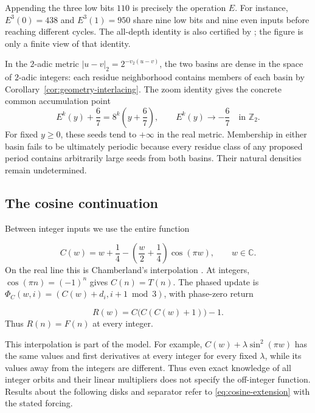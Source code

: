 Appending the three low bits $110$ is precisely the operation $E$.
For instance, $E^3(0)=438$ and $E^3(1)=950$ share nine low bits and
nine even inputs before reaching different cycles.
The all-depth identity is also certified by
; the figure is only a finite
view of that identity.

In the $2$-adic metric $|u-v|_2=2^{-v_2(u-v)}$, the two basins are
dense in the space of $2$-adic integers: each residue neighborhood
contains members of each basin by Corollary~\ref{cor:geometry-interlacing}.
The zoom identity gives the concrete common accumulation point
\[
 E^k(y)+\frac67=8^k\left(y+\frac67\right),
 \qquad E^k(y)\longrightarrow-\frac67\quad\text{in }\mathbb Z_2.
\]
For fixed $y\ge0$, these seeds tend to $+\infty$ in the real metric.
Membership in either basin fails to be ultimately periodic because
every residue class of any proposed period contains arbitrarily large
seeds from both basins. Their natural densities remain undetermined.

\subsection{The cosine continuation}

Between integer inputs we use the entire function

\begin{equation}\label{eq:cosine-extension}
 C(w)=w+\frac14-\left(\frac w2+\frac14\right)\cos(\pi w),
 \qquad w\in\mathbb C.
\end{equation}
On the real line this is Chamberland's interpolation
\cite{chamberland-1996,chamberland-survey}. At integers,
$\cos(\pi n)=(-1)^n$ gives $C(n)=T(n)$. The phased update is
$\Phi_C(w,i)=(C(w)+d_i,i+1\bmod3)$, with phase-zero return

\begin{equation}\label{eq:complex-return}
 R(w)=C\bigl(C(C(w)+1)\bigr)-1.
\end{equation}
Thus $R(n)=F(n)$ at every integer.

This interpolation is part of the model. For example,
$C(w)+\lambda\sin^2(\pi w)$ has the same values and first derivatives
at every integer for every fixed $\lambda$, while its values away from
the integers are different. Thus even exact knowledge of all integer
orbits and their linear multipliers does not specify the off-integer
function. Results about the following disks and separator refer to
\eqref{eq:cosine-extension} with the stated forcing.

